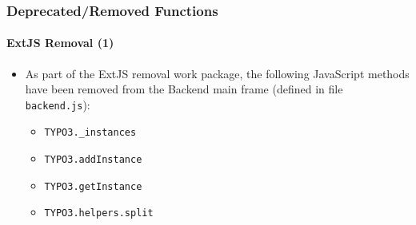 \begin{frame}[fragile]
	\frametitle{Deprecated/Removed Functions}
	\framesubtitle{ExtJS Removal (1)}

	\begin{itemize}
		\item As part of the ExtJS removal work package, the following JavaScript methods have been removed
			from the Backend main frame (defined in file \texttt{backend.js}):

		\begin{itemize}
			\item \texttt{TYPO3.\_instances}
			\item \texttt{TYPO3.addInstance}
			\item \texttt{TYPO3.getInstance}
			\item \texttt{TYPO3.helpers.split}
		\end{itemize}

	\end{itemize}

\end{frame}
